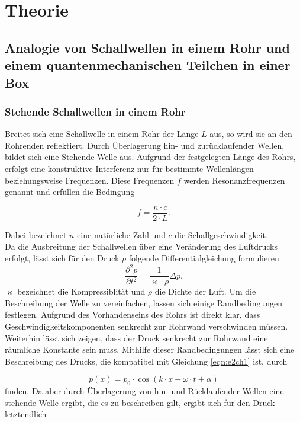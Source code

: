 \section{Theorie}
\label{sec:Theorie}


\subsection{Analogie von Schallwellen in einem Rohr und einem quantenmechanischen Teilchen in einer Box}
\label{subsec:tch1}

\subsubsection{Stehende Schallwellen in einem Rohr}
\label{subsubsec:tch11}
Breitet sich eine Schallwelle in einem Rohr der Länge $L$ aus, so wird sie an den Rohrenden reflektiert.
Durch Überlagerung hin- und zurücklaufender Wellen, bildet sich eine Stehende Welle aus.
Aufgrund der festgelegten Länge des Rohrs, erfolgt eine konstruktive Interferenz nur für bestimmte Wellenlängen
beziehungsweise Frequenzen. Diese Frequenzen $f$ werden Resonanzfrequenzen genannt und erfüllen die Bedingung


\begin{equation}
  \label{eqn:e1ch1}
  f = \frac{n \cdot c}{2 \cdot L}.
\end{equation}


Dabei bezeichnet $n$ eine natürliche Zahl und $c$ die Schallgeschwindigkeit.\\
Da die Ausbreitung der Schallwellen über eine Veränderung des Luftdrucks erfolgt, lässt sich für den
Druck $p$ folgende Differentialgleichung formulieren
\begin{equation}
  \label{eqn:e2ch1}
  \frac{\partial ^2 p}{\partial  t^2} = \frac{1}{\varkappa \cdot \rho} \Delta  p.
\end{equation}
$\varkappa$ bezeichnet die Kompressiblität und $\rho$ die Dichte der Luft.
Um die Beschreibung der Welle zu vereinfachen, lassen sich einige Randbedingungen
festlegen. Aufgrund des Vorhandenseins des Rohrs ist direkt klar, dass Geschwindigkeitskomponenten
senkrecht zur Rohrwand verschwinden müssen. Weiterhin lässt sich zeigen, dass der Druck senkrecht zur Rohrwand eine räumliche Konstante sein muss.
Mithilfe dieser Randbedingungen lässt sich eine Beschreibung des Drucks,
die kompatibel mit Gleichung \eqref{eqn:e2ch1} ist, durch


\begin{equation}
  \label{eqn:e3ch1}
  p(x) = p_{0} \cdot \cos\left( k\cdot x - \omega \cdot t + \alpha \right)
\end{equation}
finden. Da aber durch Überlagerung von hin- und Rücklaufender Wellen eine stehende Welle ergibt, die es
zu beschreiben gilt, ergibt sich für den Druck letztendlich

